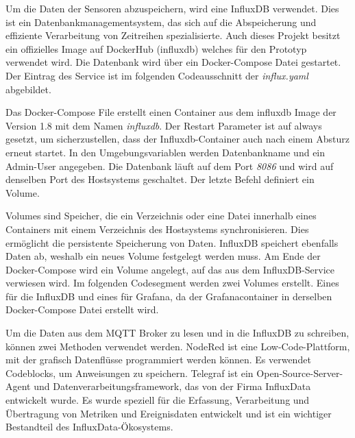 \documentclass[a4paper, 12pt, oneside, toc=listofnumbered, bibliography=totoc]{scrbook}
\begin{document}
		
		
		Um die Daten der Sensoren abzuspeichern, wird eine InfluxDB verwendet. Dies ist ein Datenbankmanagementsystem, das sich auf die Abspeicherung und effiziente Verarbeitung von Zeitreihen spezialisierte. Auch dieses Projekt besitzt ein offizielles Image auf DockerHub (influxdb) welches für den Prototyp verwendet wird. Die Datenbank wird über ein Docker-Compose Datei gestartet. Der Eintrag des Service ist im folgenden Codeausschnitt der \textit{influx.yaml} abgebildet.
		
		
		
		Das Docker-Compose File erstellt einen Container aus dem influxdb Image der Version 1.8 mit dem Namen \textit{influxdb}. Der Restart Parameter ist auf always gesetzt, um sicherzustellen, dass der Influxdb-Container auch nach einem Absturz erneut startet. In den Umgebungsvariablen werden Datenbankname und ein Admin-User angegeben. Die Datenbank läuft auf dem Port \textit{8086} und wird auf denselben Port des Hostsystems geschaltet. Der letzte Befehl definiert ein Volume. 
		
		Volumes sind Speicher, die ein Verzeichnis oder eine Datei innerhalb eines Containers mit einem Verzeichnis des Hostsystems synchronisieren. Dies ermöglicht die persistente Speicherung von Daten. InfluxDB speichert ebenfalls Daten ab, weshalb ein neues Volume festgelegt werden muss. Am Ende der Docker-Compose wird ein Volume angelegt, auf das aus dem InfluxDB-Service verwiesen wird. Im folgenden Codesegment werden zwei Volumes erstellt. Eines für die InfluxDB und eines für Grafana, da der Grafanacontainer in derselben Docker-Compose Datei erstellt wird.
		
		
		
		Um die Daten aus dem MQTT Broker zu lesen und in die InfluxDB zu schreiben, können zwei Methoden verwendet werden. NodeRed ist eine Low-Code-Plattform, mit der grafisch Datenflüsse programmiert werden können. Es verwendet Codeblocks, um Anweisungen zu speichern. Telegraf ist ein Open-Source-Server-Agent und Datenverarbeitungsframework, das von der Firma InfluxData entwickelt wurde. Es wurde speziell für die Erfassung, Verarbeitung und Übertragung von Metriken und Ereignisdaten entwickelt und ist ein wichtiger Bestandteil des InfluxData-Ökosystems. 
		
\end{document}
